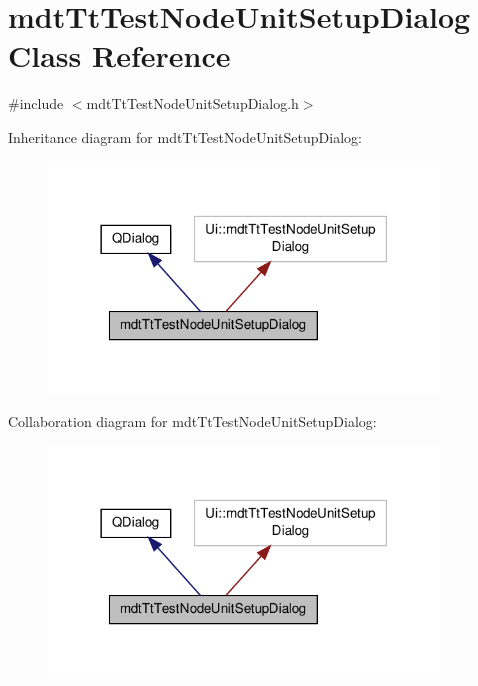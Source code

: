 \hypertarget{classmdt_tt_test_node_unit_setup_dialog}{\section{mdt\-Tt\-Test\-Node\-Unit\-Setup\-Dialog Class Reference}
\label{classmdt_tt_test_node_unit_setup_dialog}
}


{\ttfamily \#include $<$mdt\-Tt\-Test\-Node\-Unit\-Setup\-Dialog.\-h$>$}



Inheritance diagram for mdt\-Tt\-Test\-Node\-Unit\-Setup\-Dialog\-:
\nopagebreak
\begin{figure}[H]
\begin{center}
\leavevmode
\includegraphics[width=294pt]{classmdt_tt_test_node_unit_setup_dialog__inherit__graph}
\end{center}
\end{figure}


Collaboration diagram for mdt\-Tt\-Test\-Node\-Unit\-Setup\-Dialog\-:
\nopagebreak
\begin{figure}[H]
\begin{center}
\leavevmode
\includegraphics[width=294pt]{classmdt_tt_test_node_unit_setup_dialog__coll__graph}
\end{center}
\end{figure}
